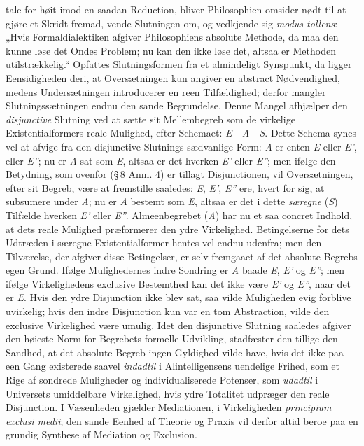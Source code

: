 \documentclass[12pt]{book}
\newcommand{\opage}[1]{\marginnote{\footnotesize\textit{[#1]}}}
\begin{document}
tale for høit imod en saadan Reduction, bliver Philosophien omsider nødt til at gjøre
et Skridt fremad, vende Slutningen om, og vedkjende sig \textit{modus tollens}:
„Hvis Formaldialektiken afgiver Philosophiens absolute Methode, da maa den kunne
løse det Ondes Problem; nu kan den ikke løse det, altsaa er Methoden
utilstrækkelig.“ Opfattes Slutningsformen fra et almindeligt Synspunkt, da ligger
Eensidigheden deri, at Oversætningen kun angiver en abstract Nødvendighed, medens
Undersætningen introducerer en reen Tilfældighed; derfor mangler
Slutningssætningen endnu den sande Begrundelse. Denne Mangel afhjælper den
\emph{disjunctive} Slutning ved at sætte sit Mellembegreb som de virkelige
Existentialformers reale Mulighed, efter Schemaet: \textit{E---A---S}. Dette Schema
synes vel at afvige fra den disjunctive Slutnings sædvanlige Form: \textit{A} er
enten \textit{E} eller \textit{E'}, eller \textit{E''}; nu er \textit{A} sat som
\textit{E}, altsaa er det hverken \textit{E'} eller \textit{E''}; men ifølge den
Betydning, som ovenfor (\S\,8 Anm. 4) er tillagt Disjunctionen, vil Oversætningen,
efter sit Begreb, være at fremstille saaledes: \textit{E}, \textit{E'},
\textit{E''} ere, hvert for sig, at subsumere under \textit{A}; nu er \textit{A}
bestemt som \textit{E}, altsaa er det i dette \emph{særegne} (\textit{S}) Tilfælde
hverken \textit{E'} eller \textit{E''}. Almeenbegrebet (\textit{A}) har nu et
\opage{87} saa concret Indhold, at dets reale Mulighed præformerer den ydre Virkelighed.
Betingelserne for dets Udtræden i særegne Existentialformer hentes vel endnu
udenfra; men den Tilværelse, der afgiver disse Betingelser, er selv fremgaaet af det
absolute Begrebs egen Grund. Ifølge Mulighedernes indre Sondring er \textit{A} baade
\textit{E}, \textit{E'} og \textit{E''}; men ifølge Virkelighedens exclusive
Bestemthed kan det ikke være \textit{E'} og \textit{E''}, naar det er \textit{E}.
Hvis den ydre Disjunction ikke blev sat, saa vilde Muligheden evig forblive
uvirkelig; hvis den indre Disjunction kun var en tom Abstraction, vilde den exclusive
Virkelighed være umulig. Idet den disjunctive Slutning saaledes afgiver den høieste
Norm for Begrebets formelle Udvikling, stadfæster den tillige den Sandhed, at det
absolute Begreb ingen Gyldighed vilde have, hvis det ikke paa een Gang existerede
saavel \emph{indadtil} i Alintelligensens uendelige Frihed, som et Rige af sondrede
Muligheder og individualiserede Potenser, som \emph{udadtil} i Universets
umiddelbare Virkelighed, hvis ydre Totalitet udpræger den reale Disjunction. I
Væsenheden gjælder Mediationen, i Virkeligheden \textit{principium exclusi medii};
den sande Eenhed af Theorie og Praxis vil derfor altid beroe paa en grundig Synthese
af Mediation og Exclusion.
\end{document}
